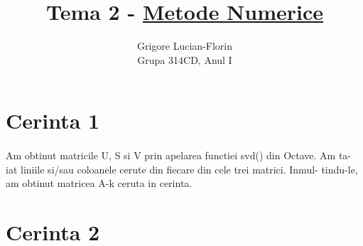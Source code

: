 \documentclass{article}
\title{\Huge Tema 2 - \underline{Metode Numerice}}
\author{Grigore Lucian-Florin \\ Grupa 314CD, Anul I}
\begin{document}
\maketitle
\section{Cerinta 1}
\paragraph{} 
Am obtinut matricile U, S si V prin apelarea functiei svd() din Octave. Am ta-
iat liniile si/sau coloanele cerute din fiecare din cele trei matrici. Inmul-
tindu-le, am obtinut matricea A-k ceruta in cerinta.

\section{Cerinta 2}
\end{document}
